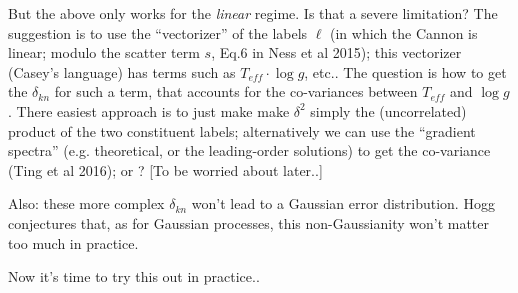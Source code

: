 \documentclass[12pt, letterpaper, preprint]{aastex}
\begin{document}
But the above only works for the {\it linear} regime. Is that a severe limitation?
The suggestion is to use the ``vectorizer'' of the labels $\ell$ (in which the Cannon is linear; modulo the scatter term $s$, Eq.6 in Ness et al 2015); this vectorizer (Casey's language) has terms such as $T_{eff}\cdot\log{g}$, etc..
The question is how to get the $\delta_{kn}$ for such a term, that accounts for the co-variances between $T_{eff}$ and $\log{g}$.
There easiest approach is to just make make $\delta^2$ simply the (uncorrelated) product of the two constituent
labels; alternatively we can use the ``gradient spectra'' (e.g. theoretical, or the leading-order solutions) to get the co-variance (Ting et al 2016);
or ? [To be worried about later..]

Also: these more complex $\delta_{kn}$ won't lead to a Gaussian error distribution. Hogg conjectures that, as for Gaussian processes, this non-Gaussianity won't matter too much in practice.

Now it's time to try this out in practice..
\end{document}
